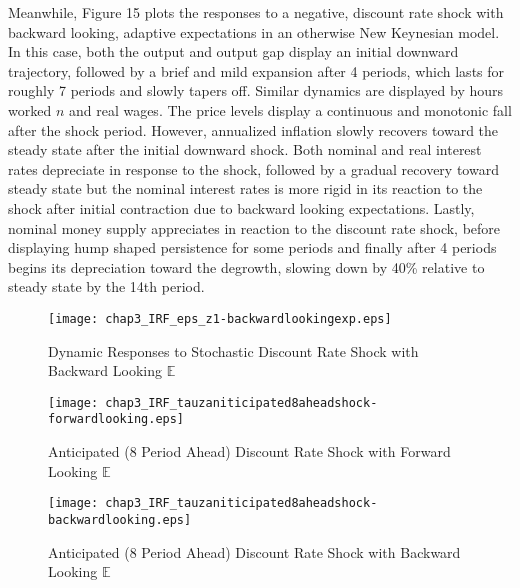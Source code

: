 \documentclass[12pt]{article}
\newcommand{\1}{\mathbbm 1}
\begin{document}
Meanwhile, Figure 15 plots the responses to a negative, discount rate shock with backward looking, adaptive expectations in an otherwise New Keynesian model. In this case, both the output and output gap display an initial downward trajectory, followed by a brief and mild expansion after 4 periods, which lasts for roughly 7 periods and slowly tapers off. Similar dynamics are displayed by hours worked $n$ and real wages. The price levels display a continuous and monotonic fall after the shock period. However, annualized inflation slowly recovers toward the steady state after the initial downward shock. Both nominal and real interest rates depreciate in response to the shock, followed by a gradual recovery toward steady state but the nominal interest rates is more rigid in its reaction to the shock after initial contraction due to backward looking expectations. Lastly, nominal money supply appreciates in reaction to the discount rate shock, before displaying hump shaped persistence for some periods and finally after 4 periods begins its depreciation toward the degrowth, slowing down by 40\% relative to steady state by the 14th period.


\begin{figure}[H]
	\begin{center}
		\texttt{[image: chap3\_IRF\_eps\_z1-backwardlookingexp.eps]}
	\end{center}
	\caption{Dynamic Responses to Stochastic Discount Rate Shock with Backward Looking $\mathbb{E}$}
\end{figure}



\begin{figure}[H]
	\begin{center}
		\texttt{[image: chap3\_IRF\_tauzaniticipated8aheadshock-forwardlooking.eps]}
	\end{center}
	\caption{Anticipated (8 Period Ahead) Discount Rate Shock with Forward Looking $\mathbb{E}$}
\end{figure}


\begin{figure}[H]
	\begin{center}
		\texttt{[image: chap3\_IRF\_tauzaniticipated8aheadshock-backwardlooking.eps]}
	\end{center}
	\caption{Anticipated (8 Period Ahead) Discount Rate Shock with Backward Looking $\mathbb{E}$}
\end{figure}
\end{document}
